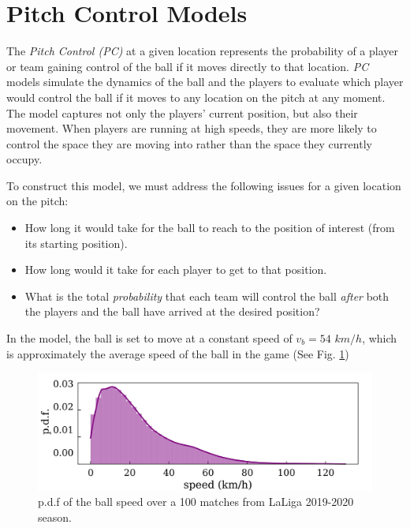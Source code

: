 \documentclass[
  10pt,
  twoside,nohyper]{book}
\providecommand{\tightlist}{%
  \setlength{\itemsep}{0pt}\setlength{\parskip}{0pt}}
\begin{document}
\section{Pitch Control Models}\label{pitch-control-models}

The \emph{Pitch Control (PC)} at a given location represents the probability of a player or team gaining control of the ball if it moves directly to that location. \emph{PC} models simulate the dynamics of the ball and the players to evaluate which player would control the ball if it moves to any location on the pitch at any moment.
The model captures not only the players' current position, but also their movement. When players are running at high speeds, they are more likely to control
the space they are moving into rather than the space they currently occupy.

To construct this model, we must address the following issues for a given location on the pitch:

\begin{itemize}
\tightlist
\item
  How long it would take for the ball to reach to the position of interest (from its starting position).
\item
  How long would it take for each player to get to that position.
\item
  What is the total \emph{probability} that each team will control the ball \emph{after} both the players and the ball have arrived at the desired position?
\end{itemize}

In the model, the ball is set to move at a constant speed of \(v_b = 54\) \(km/h\), which is approximately the average speed of the ball in the game \autocite{Spearman} (See Fig. \ref{fig:ball})

\begin{figure}[H]

{\centering \includegraphics[width=0.8\linewidth,]{imagenes/ball} 

}

\caption{p.d.f of the ball speed over a 100 matches from LaLiga 2019-2020 season.}\label{fig:ball}
\end{figure}
\end{document}
